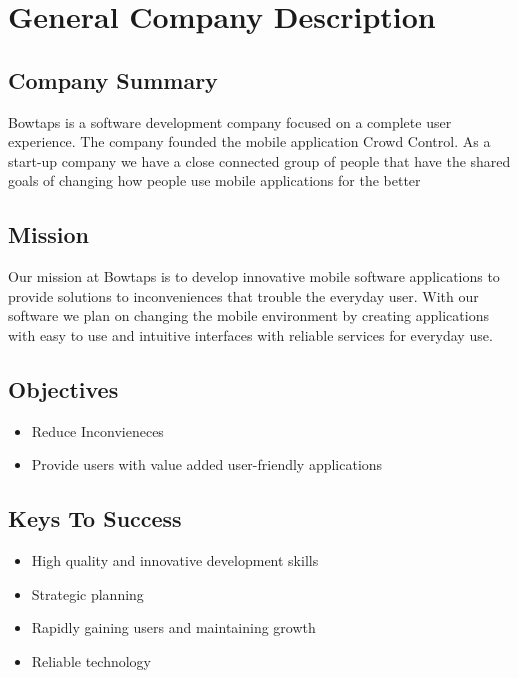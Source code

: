 

\chapter{General Company Description}


\section{Company Summary}

Bowtaps is a software development company focused on a complete user experience. The company founded the mobile application Crowd Control. As a start-up company we have a close connected group of people that have the shared goals of changing how people use mobile applications for the better

\section{Mission}

Our mission at Bowtaps is to develop innovative mobile software applications to provide solutions to inconveniences that trouble the everyday user. With our software we plan on changing the mobile environment by creating applications with easy to use and  intuitive interfaces with reliable services for everyday use.

\section{Objectives}

	\begin{itemize}
	\item Reduce Inconvieneces
	\item Provide users with value added user-friendly applications
	\end{itemize}


\section{Keys To Success}

	\begin{itemize}
	\item High quality and innovative development skills
	\item Strategic planning 
	\item Rapidly gaining users and maintaining growth 
	\item Reliable technology
	\end{itemize}

